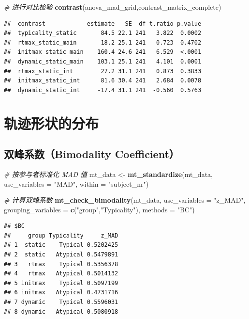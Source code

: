 \documentclass[
]{article}
\newenvironment{Shaded}{\begin{snugshade}}{\end{snugshade}}
\newcommand{\AttributeTok}[1]{\textcolor[rgb]{0.13,0.29,0.53}{#1}}
\newcommand{\CommentTok}[1]{\textcolor[rgb]{0.56,0.35,0.01}{\textit{#1}}}
\newcommand{\FunctionTok}[1]{\textcolor[rgb]{0.13,0.29,0.53}{\textbf{#1}}}
\newcommand{\NormalTok}[1]{#1}
\newcommand{\OtherTok}[1]{\textcolor[rgb]{0.56,0.35,0.01}{#1}}
\newcommand{\StringTok}[1]{\textcolor[rgb]{0.31,0.60,0.02}{#1}}
\begin{document}
\begin{Shaded}
\begin{Highlighting}[]
\CommentTok{\# 进行对比检验}
\FunctionTok{contrast}\NormalTok{(anova\_mad\_grid,contrast\_matrix\_complete)}
\end{Highlighting}
\end{Shaded}

\begin{verbatim}
##  contrast            estimate   SE  df t.ratio p.value
##  typicality_static       84.5 22.1 241   3.822  0.0002
##  rtmax_static_main       18.2 25.1 241   0.723  0.4702
##  initmax_static_main    160.4 24.6 241   6.529  <.0001
##  dynamic_static_main    103.1 25.1 241   4.101  0.0001
##  rtmax_static_int        27.2 31.1 241   0.873  0.3833
##  initmax_static_int      81.6 30.4 241   2.684  0.0078
##  dynamic_static_int     -17.4 31.1 241  -0.560  0.5763
\end{verbatim}

\section{轨迹形状的分布}\label{ux8f68ux8ff9ux5f62ux72b6ux7684ux5206ux5e03}

\subsection{双峰系数（Bimodality
Coefficient）}\label{ux53ccux5cf0ux7cfbux6570bimodality-coefficient}

\begin{Shaded}
\begin{Highlighting}[]
\CommentTok{\# 按参与者标准化 MAD 值}
\NormalTok{mt\_data }\OtherTok{\textless{}{-}} \FunctionTok{mt\_standardize}\NormalTok{(mt\_data, }\AttributeTok{use\_variables =} \StringTok{"MAD"}\NormalTok{, }\AttributeTok{within =} \StringTok{"subject\_nr"}\NormalTok{)}

\CommentTok{\# 计算双峰系数}
\FunctionTok{mt\_check\_bimodality}\NormalTok{(mt\_data, }\AttributeTok{use\_variables =} \StringTok{"z\_MAD"}\NormalTok{,}
  \AttributeTok{grouping\_variables =} \FunctionTok{c}\NormalTok{(}\StringTok{"group"}\NormalTok{,}\StringTok{"Typicality"}\NormalTok{), }\AttributeTok{methods =} \StringTok{"BC"}\NormalTok{)}
\end{Highlighting}
\end{Shaded}

\begin{verbatim}
## $BC
##     group Typicality     z_MAD
## 1  static    Typical 0.5202425
## 2  static   Atypical 0.5479891
## 3   rtmax    Typical 0.5356378
## 4   rtmax   Atypical 0.5014132
## 5 initmax    Typical 0.5097199
## 6 initmax   Atypical 0.4731716
## 7 dynamic    Typical 0.5596031
## 8 dynamic   Atypical 0.5080918
\end{verbatim}
\end{document}
